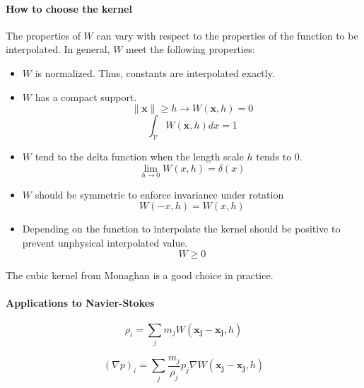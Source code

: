 \documentclass[11pt, oneside, a4paper]{memoir}
\begin{document}
\paragraph{How to choose the kernel}
The properties of $W$ can vary with respect to the properties of the function to be interpolated. In general, $W$ meet the following properties:
\begin{itemize}
\item $W$ is normalized. Thus, constants are interpolated exactly.
\item $W$ has a compact support.
\begin{equation}
\parallel \mathbf{x} \parallel \geq h \rightarrow W(\mathbf{x},h) = 0 
\end{equation}
\begin{equation}
\int_{\mathcal{V}} W(\mathbf{x},h) dx = 1
\end{equation}
\item $W$ tend to the delta function when the length scale $h$ tends to $0$.
\begin{equation}
\lim_{h \rightarrow 0} W(x,h) = \delta(x)
\end{equation}
\item $W$ should be symmetric to enforce invariance under rotation
\begin{equation}
W(-x,h) = W(x,h)
\end{equation}
\item Depending on the function to interpolate the kernel should be positive to prevent unphysical interpolated value.
\begin{equation}
W \geq 0
\end{equation}
\end{itemize}

The cubic kernel from Monaghan is a good choice in practice.

\paragraph{Applications to Navier-Stokes}

\begin{equation}
\rho_{i} = \sum_{j} m_{j}W(\mathbf{x_{j}}-\mathbf{x_{j}},h)
\end{equation}

\begin{equation}
\left(\nabla p\right)_{i} = \sum_{j} \frac{m_{j}}{\rho_{j}} p_{j} \nabla W(\mathbf{x_{j}}-\mathbf{x_{j}},h)
\end{equation}
\end{document}
